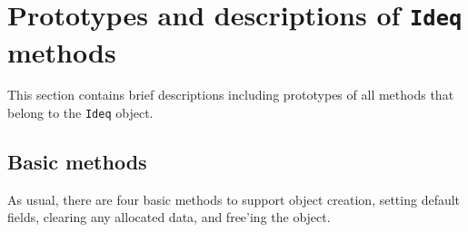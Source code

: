 \par
\section{Prototypes and descriptions of {\tt Ideq} methods}
\label{section:Ideq:proto}
\par
This section contains brief descriptions including prototypes
of all methods that belong to the {\tt Ideq} object.
\par
\subsection{Basic methods}
\label{subsection:Ideq:proto:basics}
\par
As usual, there are four basic methods to support object creation,
setting default fields, clearing any allocated data, and free'ing
the object.
\par
